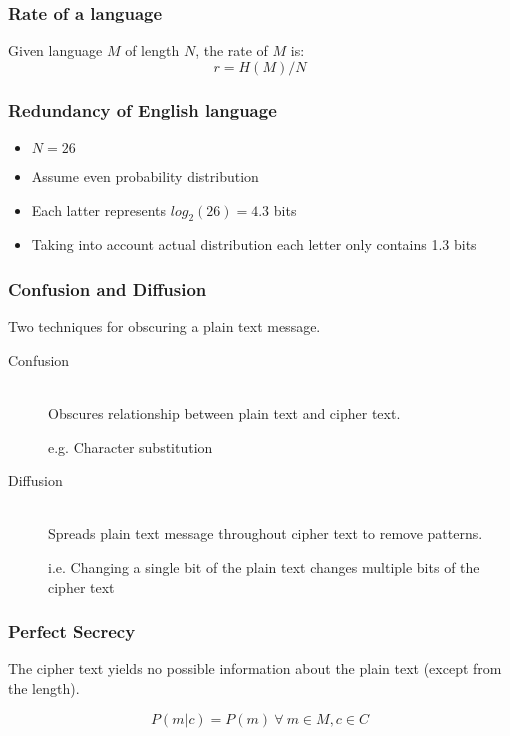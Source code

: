 \documentclass[a4paper]{article}
\begin{document}
\subsubsection{Rate of a language}

Given language $M$ of length $N$, the rate of $M$ is:
\[
  r = H(M) / N
\]

\subsubsection{Redundancy of English language}

\begin{itemize}
  \item $N = 26$
  \item Assume even probability distribution
  \item Each latter represents $log_{2}(26) = 4.3$ bits
  \item Taking into account actual distribution each letter only contains 1.3
        bits
\end{itemize}

\subsubsection{Confusion and Diffusion}

Two techniques for obscuring a plain text message.

\begin{description}
  \item[Confusion] \hfill \\
    Obscures relationship between plain text and cipher text.

    e.g. Character substitution

  \item[Diffusion] \hfill \\
    Spreads plain text message throughout cipher text to remove patterns.

    i.e. Changing a single bit of the plain text changes multiple bits of the
    cipher text
\end{description}

\subsubsection{Perfect Secrecy}

The cipher text yields no possible information about the plain text (except from
the length).

\[
  P(m|c) = P(m) \: \forall \: m \in M, c \in C
\]
\end{document}
